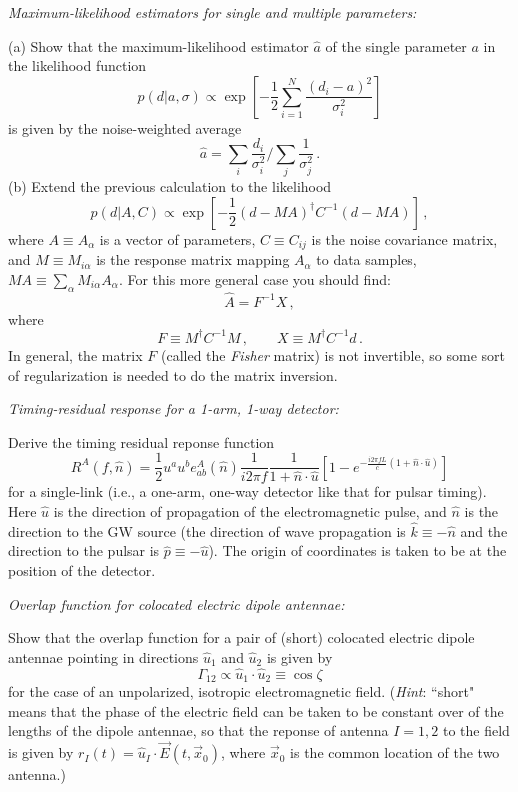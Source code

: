 \documentclass[11pt]{article}
\numberwithin{equation}{section}
\def\be{\begin{equation}}
\def\ee{\end{equation}}
\def\i{\item{}}
\begin{document}
\i {\em Maximum-likelihood estimators for single and multiple
parameters:}

(a) Show that the maximum-likelihood estimator $\hat a$ of 
the single parameter $a$ in the likelihood function
\be
p(d|a, \sigma) \propto
\exp\left[-\frac{1}{2}\sum_{i=1}^N \frac{(d_i-a)^2}{\sigma_i^2}\right]
\ee
%
is given by the noise-weighted average
%
\be
\hat a={\sum_i \frac{d_i}{\sigma_i^2}}\bigg/{\sum_j \frac{1}{\sigma_j^2}}\,.
\ee
%
(b) Extend the previous calculation to the likelihood
\be
p(d|A, C) \propto
\exp\left[-\frac{1}{2}(d-MA)^\dagger C^{-1} (d-MA)\right]\,,
\ee
%
where $A\equiv A_\alpha$ is a vector of parameters,
$C\equiv C_{ij}$ is the noise covariance matrix, and 
$M\equiv M_{i\alpha}$ is the response matrix mapping 
$A_\alpha$ to data samples, $MA\equiv \sum_\alpha M_{i\alpha}A_\alpha$.
For this more general case you should find:
%
\be
\hat A = F^{-1} X\,,
\ee
%
where
%
\be
F \equiv M^\dagger C^{-1} M\,,\qquad
X \equiv M^\dagger C^{-1} d\,.
\ee
%
In general, the matrix $F$ (called the {\em Fisher} matrix)
is not invertible, so some sort of regularization is needed
to do the matrix inversion.

\i {\em Timing-residual response for a 1-arm, 1-way detector:}

Derive the timing residual reponse function
%
\be
R^A(f,\hat n) = 
\frac{1}{2}u^a u^b e^A_{ab}(\hat n)
\frac{1}{i2\pi f}
\frac{1}{1+\hat n\cdot \hat u}
\left[1-e^{-\frac{i2\pi fL}{c}(1+\hat n\cdot\hat u)}\right]
\ee
%
for a single-link (i.e., a one-arm, one-way detector like 
that for pulsar timing).
Here $\hat u$ is the direction of propagation of the
electromagnetic pulse, and $\hat n$ is the direction to the 
GW source (the direction of wave propagation is 
$\hat k\equiv -\hat n$ and the direction to the pulsar is
$\hat p\equiv -\hat u$).
The origin of coordinates is taken to be at the position 
of the detector.

\i {\em Overlap function for colocated electric dipole antennae:}

Show that the overlap function for a pair of (short)
colocated electric dipole antennae pointing in directions 
$\hat u_1$ and $\hat u_2$ is given by 
%
\be
\Gamma_{12} 
\propto
\hat u_1\cdot\hat u_2 
\equiv\cos\zeta
\ee
% 
for the case of an unpolarized, isotropic electromagnetic field.
({\em Hint}: ``short" means that the phase of the electric 
field can be taken to be constant over of the lengths of 
the dipole antennae, 
so that the reponse of antenna $I=1,2$ to the field is
given by $r_I(t)=\hat u_I\cdot\vec E(t, \vec x_0)$, where
$\vec x_0$ is the common location of the two antenna.)
 
\end{document}
